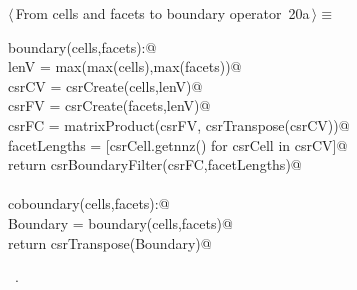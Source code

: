 \documentclass[11pt,oneside]{article}	%
\begin{document}
\begin{flushleft} \small \label{scrap35}
\protect{}$\langle\,$From cells and facets to boundary operator\nobreak\ {\footnotesize 20a}$\,\rangle\equiv$
\vspace{-1ex}
\begin{list}{}{} \item
\mbox{}\verb@def boundary(cells,facets):@\\
\mbox{}\verb@   lenV = max(max(cells),max(facets))@\\
\mbox{}\verb@   csrCV = csrCreate(cells,lenV)@\\
\mbox{}\verb@   csrFV = csrCreate(facets,lenV)@\\
\mbox{}\verb@   csrFC = matrixProduct(csrFV, csrTranspose(csrCV))@\\
\mbox{}\verb@   facetLengths = [csrCell.getnnz() for csrCell in csrCV]@\\
\mbox{}\verb@   return csrBoundaryFilter(csrFC,facetLengths)@\\
\mbox{}\verb@@\\
\mbox{}\verb@def coboundary(cells,facets):@\\
\mbox{}\verb@   Boundary = boundary(cells,facets)@\\
\mbox{}\verb@   return csrTranspose(Boundary)@\\
\mbox{}\verb@@{\NWsep}
\end{list}
\vspace{-1ex}
\footnotesize\addtolength{\baselineskip}{-1ex}
\begin{list}{}{\setlength{\itemsep}{-\parsep}\setlength{\itemindent}{-\leftmargin}}
\item \NWtxtMacroRefIn\ .
\end{list}
\end{flushleft}
\end{document}
